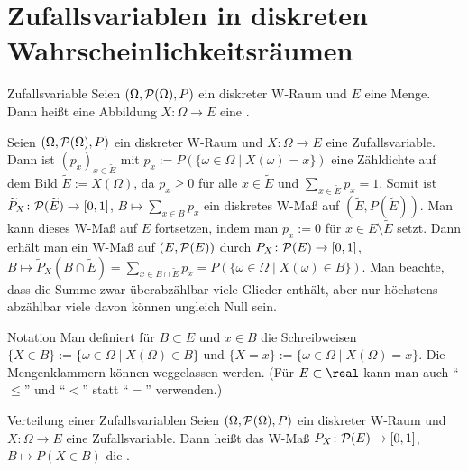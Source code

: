 \section{%
    Zufallsvariablen in diskreten Wahrscheinlichkeitsräumen%
}

\begin{Def}{Zufallsvariable}
    Seien $(\Omega, \P(\Omega), P)$ ein diskreter W-Raum und $E$ eine Menge.\\
    Dann heißt eine Abbildung $X\colon \Omega \rightarrow E$ eine
    .
\end{Def}

\begin{Bem}
    Seien $(\Omega, \P(\Omega), P)$ ein diskreter W-Raum und $X\colon \Omega \rightarrow E$
    eine Zufallsvariable.
    Dann ist $(p_x)_{x \in \widetilde{E}}$ mit
    $p_x := P(\{\omega \in \Omega \;|\; X(\omega) = x\})$
    eine Zähldichte auf dem Bild $\widetilde{E} := X(\Omega)$,
    da $p_x \ge 0$ für alle $x \in \widetilde{E}$ und $\sum_{x \in \widetilde{E}} p_x = 1$.
    Somit ist $\widetilde{P}_X\colon \P(\widetilde{E}) \rightarrow [0, 1]$,
    $B \mapsto \sum_{x \in B} p_x$ ein diskretes W-Maß auf $(\widetilde{E}, P(\widetilde{E}))$.
    Man kann dieses W-Maß auf $E$ fortsetzen, indem man $p_x := 0$ für
    $x \in E \setminus \widetilde{E}$ setzt.
    Dann erhält man ein W-Maß auf $(E, \P(E))$ durch
    $P_X\colon \P(E) \rightarrow [0, 1]$, $B \mapsto \widetilde{P}_X(B \cap \widetilde{E})
    = \sum_{x \in B \cap \widetilde{E}} p_x = P(\{\omega \in \Omega \;|\; X(\omega) \in B\})$.
    Man beachte, dass die Summe zwar überabzählbar viele Glieder enthält, aber nur
    höchstens abzählbar viele davon können ungleich Null sein.
\end{Bem}

\begin{Def}{Notation}
    Man definiert für $B \subset E$ und $x \in B$ die Schreibweisen\\
    $\{X \in B\} := \{\omega \in \Omega \;|\; X(\Omega) \in B\}$ und
    $\{X = x\} := \{\omega \in \Omega \;|\; X(\Omega) = x\}$.
    Die Mengenklammern können weggelassen werden.
    (Für $E \subset \real$ kann man auch "`$\le$"' und "`$<$"' statt "`$=$"' verwenden.)
\end{Def}

\begin{Def}{Verteilung einer Zufallsvariablen}
    Seien $(\Omega, \P(\Omega), P)$ ein diskreter W-Raum und\\
    $X\colon \Omega \rightarrow E$ eine Zufallsvariable.
    Dann heißt das W-Maß $P_X\colon \P(E) \rightarrow [0, 1]$, $B \mapsto P(X \in B)$
    die .
\end{Def}

